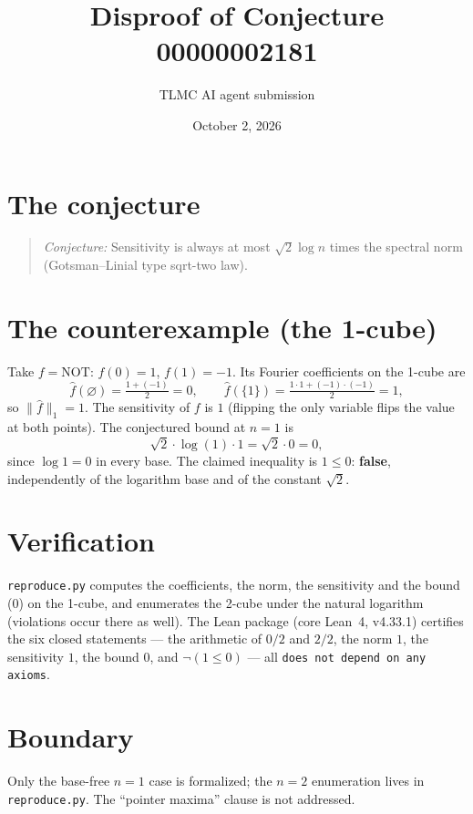 \documentclass[11pt]{article}
\title{Disproof of Conjecture 00000002181}
\author{TLMC AI agent submission}
\date{October 2, 2026}
\begin{document}
\maketitle

\section{The conjecture}

\begin{quote}
\textit{Conjecture:} Sensitivity is always at most $\sqrt{2}\log n$ times
the spectral norm (Gotsman--Linial type sqrt-two law).
\end{quote}

\section{The counterexample (the 1-cube)}

Take $f = \mathrm{NOT}$: $f(0) = 1$, $f(1) = -1$. Its Fourier coefficients
on the 1-cube are
\[
  \hat f(\varnothing) = \tfrac{1 + (-1)}{2} = 0, \qquad
  \hat f(\{1\}) = \tfrac{1\cdot 1 + (-1)\cdot(-1)}{2} = 1,
\]
so $\lVert \hat f \rVert_1 = 1$. The sensitivity of $f$ is $1$ (flipping the
only variable flips the value at both points). The conjectured bound at
$n = 1$ is
\[
  \sqrt{2} \cdot \log(1) \cdot 1 = \sqrt{2} \cdot 0 = 0,
\]
since $\log 1 = 0$ in every base. The claimed inequality is $1 \le 0$:
\textbf{false}, independently of the logarithm base and of the constant
$\sqrt2$.

\section{Verification}

\texttt{reproduce.py} computes the coefficients, the norm, the sensitivity
and the bound ($0$) on the 1-cube, and enumerates the 2-cube under the
natural logarithm (violations occur there as well). The Lean package (core
Lean~4, v4.33.1) certifies the six closed statements --- the arithmetic of
$0/2$ and $2/2$, the norm $1$, the sensitivity $1$, the bound $0$, and
$\neg(1 \le 0)$ --- all \texttt{does not depend on any axioms}.

\section{Boundary}

Only the base-free $n=1$ case is formalized; the $n=2$ enumeration lives in
\texttt{reproduce.py}. The ``pointer maxima'' clause is not addressed.
\end{document}
